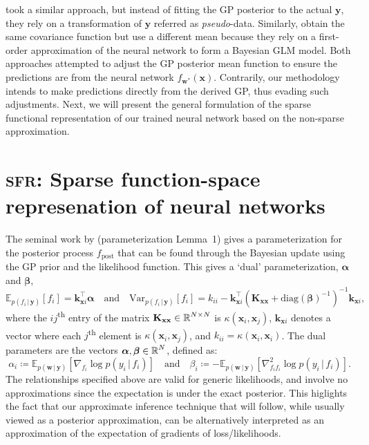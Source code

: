 \documentclass{article}
\renewcommand{\paragraph}[1]{{\bf #1}~~}
\newcommand{\our}{\textsc{sfr}\xspace}
\newcommand{\mathbold}[1]{\bm{#1}}
\newcommand{\mbf}[1]{\mathbf{#1}}
\renewcommand{\mid}{\,|\,}
\newcommand{\valpha}[0]{\mathbold{\alpha}}
\newcommand{\vbeta}[0]{\mathbold{\beta}}
\newcommand{\diag}{\text{{diag}}}
\newcommand{\vx}{\mbf{x}}
\newcommand{\vy}{\mbf{y}}
\newcommand{\vw}{\mbf{w}}
\newcommand{\MKxx}{\mbf{K}_{\mbf{x}\mbf{x}}}
\newcommand{\vk}{\mbf{k}}
\newcommand{\myexpect}{\mathbb{E}}
\begin{document}
%
\citet{khan2019approximate} took a similar approach, but instead of fitting the GP posterior to the actual $\vy$, they rely on a transformation of $\vy$ referred as {\em pseudo}-data. Similarly, \citet{immer2021improving} obtain the same covariance function but use a different mean because they rely on a first-order approximation of the neural network to form a Bayesian GLM model. Both approaches attempted to adjust the GP posterior mean function to ensure the predictions are from the neural network $f_{\vw^*}(\vx)$. 
Contrarily, our methodology intends to make predictions directly from the derived GP, thus evading such adjustments. Next, we will present the general formulation of the sparse functional representation of our trained neural network based on the non-sparse approximation. 



\section{\our: Sparse function-space represenation of neural networks}
The seminal work by \citet{csato2002sparse} (parameterization Lemma~1) gives a parameterization for the posterior process $f_{\textrm{post}}$ that can be found through the Bayesian update using the GP prior and the likelihood function. This gives a `dual' parameterization, $\valpha$ and $\vbeta$,
%
\begin{equation}  \label{eq:gp_pred}
  \myexpect_{p(f_i \mid\vy)}[f_i]= \vk_{\vx i}^\top \valpha \quad \text{and} \quad
  \mathrm{Var}_{p(f_i \mid \vy)}[f_i] = k_{ii} - \vk_{\vx i}^\top ( \MKxx + \diag(\vbeta)^{-1})^{-1} \vk_{\vx i},
\end{equation}
%
where the $ij$\textsuperscript{th} entry of the matrix $\MKxx \in \R^{N \times N}$ is $\kappa(\vx_i,\vx_j)$, $\vk_{\vx i}$ denotes a vector where each $j$\textsuperscript{th} element is $\kappa(\vx_i, \vx_j)$, and $k_{ii} = \kappa(\vx_i, \vx_i)$.  The dual parameters are the vectors $\valpha, \vbeta \in \R^{N}$, defined as:
%
\begin{equation}
  \label{eq:dual_param}
  \alpha_i \coloneqq \myexpect_{p(\vw \mid \vy)}[\nabla_{f_i}\log p(y_i \mid f_i)]
  \quad \text{and} \quad
  \beta_i \coloneqq - \myexpect_{p(\vw \mid \vy)}[\nabla^2_{f_i f_i}\log p(y_i \mid f_i)] .
\end{equation}
%
The relationships specified above are valid for generic likelihoods, and involve no approximations since the expectation is under the exact posterior. This higlights the fact that our approximate inference technique that will follow, while usually viewed as a posterior approximation, can be alternatively interpreted as an approximation of the expectation of gradients of loss/likelihoods.
\end{document}
